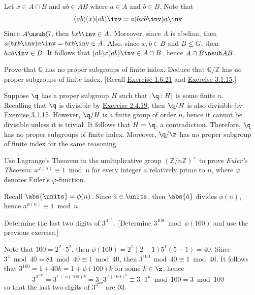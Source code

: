 \begin{sol}
    Let $x \in A \cap B$ and $ab \in AB$ where $a \in A$ and $b \in B$. Note that
    \[(ab)(x)(ab)\inv = a(bxb\inv)a\inv\]
    Since $A \nsub G$, then $bxb\inv \in A$. Moreover, since $A$ is abelian, then $a(bxb\inv)a\inv = bxb\inv \in A$. Also, since $x, b \in B$ and $B \leq G$, then $bxb\inv \in B$. It follows that $(ab)x(ab)\inv \in A \cap B$, hence $A \cap B \nsub AB$.
\end{sol}

\begin{exercise}\label{ex3.2.21}
    Prove that $\mathbb{Q}$ has no proper subgroups of finite index. Deduce that $\mathbb{Q}/\mathbb{Z}$ has no proper subgroups of finite index. [Recall \hyperref[ex1.6.21]{Exercise 1.6.21} and \hyperref[ex3.1.15]{Exercise 3.1.15}.]
\end{exercise}

\begin{sol}
    Suppose $\q$ has a proper subgroup $H$ such that $|\q : H|$ is some finite $n$. Recalling that $\q$ is divisible by \hyperref[ex2.4.19]{Exercise 2.4.19}, then $\q/H$ is also divisible by \hyperref[ex3.1.15]{Exercise 3.1.15}. However, $\q/H$ is a finite group of order $n$, hence it cannot be divisible unless it is trivial. It follows that $H = \q$, a contradiction. Therefore, $\q$ has no proper subgroups of finite index. Moreover, $\q/\z$ has no proper subgroup of finite index for the same reasoning.
\end{sol}

\begin{exercise}\label{ex3.2.22}
    Use Lagrange's Theorem in the multiplicative group $(\mathbb{Z}/n\mathbb{Z})^\times$ to prove \emph{Euler's Theorem}: $a^{\varphi(n)} \equiv 1 \bmod n$ for every integer $a$ relatively prime to $n$, where $\varphi$ denotes Euler's $\varphi$-function.
\end{exercise}

\begin{sol}
    Recall $\abs{\units} = \phi(n)$. Since $\bar a \in \units$, then $\abs{\bar a}$ divides $\phi(n)$, hence $a^{\phi(n)} \equiv 1 \bmod n$.
\end{sol}

\begin{exercise}\label{ex3.2.23}
    Determine the last two digits of $3^{3^{100}}$. [Determine $3^{100} \bmod \phi(100)$ and use the previous exercise.]
\end{exercise}

\begin{sol}
    Note that $100 = 2^2 \cdot 5^2$, then $\phi(100) = 2^1(2 - 1)5^1(5 - 1) = 40$. Since $3^4 \bmod 40 = 81 \bmod 40 \equiv 1 \bmod 40$, then $3^{100} \bmod 40 \equiv 1 \bmod 40$. It follows that $3^{100} = 1 + 40k = 1 + \phi(100)k$ for some $k \in \z$, hence
    \[3^{3^{100}} = 3^{1 + \phi(100)k} = 3 \cdot 3^{{\phi(100)}^k} \equiv 3 \cdot 1^k \bmod 100 = 3 \bmod 100\]
    so that the last two digits of $3^{3^{100}}$ are 03.
\end{sol}

